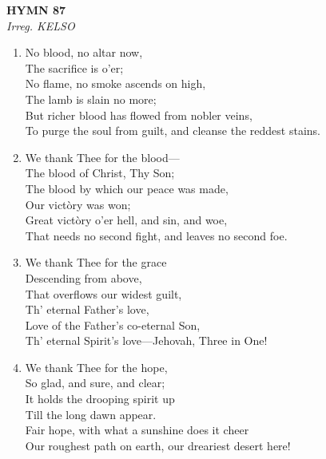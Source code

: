 \documentclass[11pt,a4paper]{article}
\begin{document}
\newpage
\begin{center}
    {\Large \textbf{HYMN 87}}
    \\
    \textit{Irreg. KELSO}
\end{center}
\vspace{1em}

\begin{enumerate}
    \item No blood, no altar now, \\
        The sacrifice is o'er; \\
        No flame, no smoke ascends on high, \\
        The lamb is slain no more; \\
        But richer blood has flowed from nobler veins, \\
        To purge the soul from guilt, and cleanse the reddest stains.

    \item We thank Thee for the blood--- \\
        The blood of Christ, Thy Son; \\
        The blood by which our peace was made, \\
        Our vict\`ory was won; \\
        Great vict\`ory o'er hell, and sin, and woe, \\
        That needs no second fight, and leaves no second foe.

    \item We thank Thee for the grace \\
        Descending from above, \\
        That overflows our widest guilt, \\
        Th' eternal Father's love, \\
        Love of the Father's co-eternal Son, \\
        Th' eternal Spirit's love---Jehovah, Three in One!

    \item We thank Thee for the hope, \\
        So glad, and sure, and clear; \\
        It holds the drooping spirit up \\
        Till the long dawn appear. \\
        Fair hope, with what a sunshine does it cheer \\
        Our roughest path on earth, our dreariest desert here!

\end{enumerate}
\end{document}
